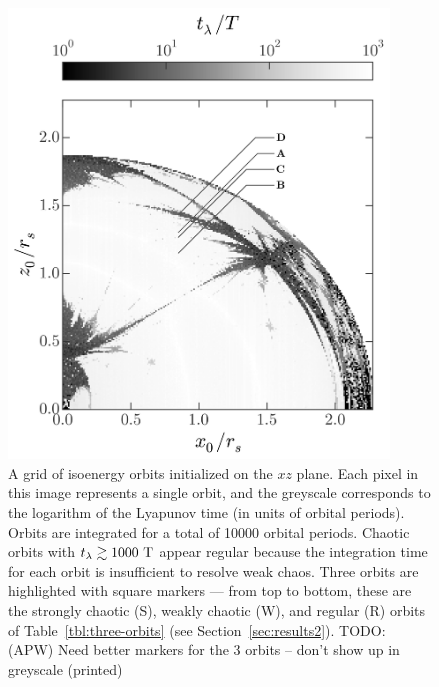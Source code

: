 \documentclass[letterpaper,12pt,preprint]{aastex}
\newcommand{\periods}{\ensuremath{{\rm T}}}
\newcommand{\todo}[2]{{\color{red} TODO: (\MakeUppercase{#1}) #2}}
\begin{document}
\begin{figure}[p]
\begin{center}
\includegraphics[width=0.9\textwidth, trim={0 1cm 0 0}]{figures/lyap_map.png}
\caption{ A grid of isoenergy orbits initialized on the $xz$ plane. Each pixel in this image represents a single orbit, and the greyscale corresponds to the logarithm of the Lyapunov time (in units of orbital periods). Orbits are integrated for a total of 10000 orbital periods. Chaotic orbits with $t_\lambda \gtrsim 1000~\periods$ appear regular because the integration time for each orbit is insufficient to resolve weak chaos. Three orbits are highlighted with square markers --- from top to bottom, these are the strongly chaotic (S), weakly chaotic (W), and regular (R) orbits of Table~\ref{tbl:three-orbits} (see Section~\ref{sec:results2}). \todo{apw}{Need better markers for the 3 orbits -- don't show up in greyscale (printed)}} \label{fig:lyapmap} 
\end{center}
\end{figure}
\end{document}
